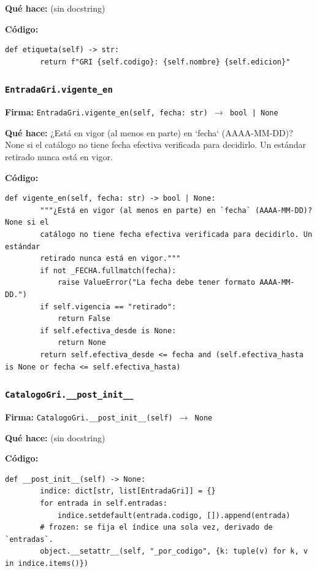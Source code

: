 \documentclass[11pt,a4paper]{article}
\begin{document}
\textbf{Qué hace:} (sin docstring)

\textbf{Código:}
\begin{lstlisting}
def etiqueta(self) -> str:
        return f"GRI {self.codigo}: {self.nombre} {self.edicion}"
\end{lstlisting}

\subsubsection*{\texttt{EntradaGri.vigente\_en}}
\textbf{Firma:} \texttt{EntradaGri.vigente\_en(self, fecha: str) $\rightarrow$ bool | None}

\textbf{Qué hace:} ¿Está en vigor (al menos en parte) en `fecha` (AAAA-MM-DD)? None si el
catálogo no tiene fecha efectiva verificada para decidirlo. Un estándar
retirado nunca está en vigor.

\textbf{Código:}
\begin{lstlisting}
def vigente_en(self, fecha: str) -> bool | None:
        """¿Está en vigor (al menos en parte) en `fecha` (AAAA-MM-DD)? None si el
        catálogo no tiene fecha efectiva verificada para decidirlo. Un estándar
        retirado nunca está en vigor."""
        if not _FECHA.fullmatch(fecha):
            raise ValueError("La fecha debe tener formato AAAA-MM-DD.")
        if self.vigencia == "retirado":
            return False
        if self.efectiva_desde is None:
            return None
        return self.efectiva_desde <= fecha and (self.efectiva_hasta is None or fecha <= self.efectiva_hasta)
\end{lstlisting}

\subsubsection*{\texttt{CatalogoGri.\_\_post\_init\_\_}}
\textbf{Firma:} \texttt{CatalogoGri.\_\_post\_init\_\_(self) $\rightarrow$ None}

\textbf{Qué hace:} (sin docstring)

\textbf{Código:}
\begin{lstlisting}
def __post_init__(self) -> None:
        indice: dict[str, list[EntradaGri]] = {}
        for entrada in self.entradas:
            indice.setdefault(entrada.codigo, []).append(entrada)
        # frozen: se fija el índice una sola vez, derivado de `entradas`.
        object.__setattr__(self, "_por_codigo", {k: tuple(v) for k, v in indice.items()})
\end{lstlisting}
\end{document}
